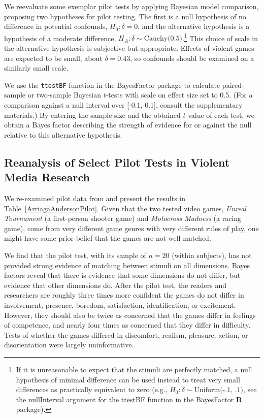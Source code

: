 \documentclass[man]{apa6}
\begin{document}
We reevaluate some exemplar pilot tests by applying Bayesian model comparison, proposing two hypotheses for pilot testing. The first is a null hypothesis of no difference in potential confounds, $H_0: \delta{} = 0$, and the alternative hypothesis is a hypothesis of a moderate difference, $H_A: \delta{} \sim{} \mbox{Cauchy(0.5)}$.\footnote{If it is unreasonable to expect that the stimuli are perfectly matched, a null hypothesis of minimal difference can be used instead to treat very small differences as practically equivalent to zero (e.g., $H_0: \delta{} \sim{} \mbox{Uniform(-.1, .1)}$, see the nullInterval argument for the ttestBF function in the BayesFactor {\bf R} package).} This choice of scale in the alternative hypothesis is subjective but appropriate. Effects of violent games are expected to be small, about $\delta = 0.43$, so confounds should be examined on a similarly small scale. 

We use the {\tt ttestBF} function in the BayesFactor package \citep{Morey:Rouder:2014} to calculate paired-sample or two-sample Bayesian $t$-tests with scale on effect size set to 0.5. (For a comparison against a null interval over [-0.1, 0.1], consult the supplementary materials.) By entering the sample size and the obtained $t$-value of each test, we obtain a Bayes factor describing the strength of evidence for or against the null relative to this alternative hypothesis.  

\subsection{Reanalysis of Select Pilot Tests in Violent Media Research}
We re-examined pilot data from \citet{Arriaga:etal:2008} and present the results in Table~\ref{ArriagaAndersonPilot}. Given that the two tested video games, {\em Unreal Tournament} (a first-person shooter game) and {\em Motocross Madness} (a racing game), come from very different game genres with very different rules of play, one might have some prior belief that the games are not well matched. 

We find that the pilot test, with its sample of $n = 20$ (within subjects), has not provided strong evidence of matching between stimuli on all dimensions. Bayes factors reveal that there is evidence that some dimensions do not differ, but evidence that other dimensions do. After the pilot test, the readers and researchers are roughly three times more confident the games do not differ in involvement, presence, boredom, satisfaction, identification, or excitement. However, they should also be twice as concerned that the games differ in feelings of competence, and nearly four times as concerned that they differ in difficulty. Tests of whether the games differed in discomfort, realism, pleasure, action, or disorientation were largely uninformative. 
\end{document}

